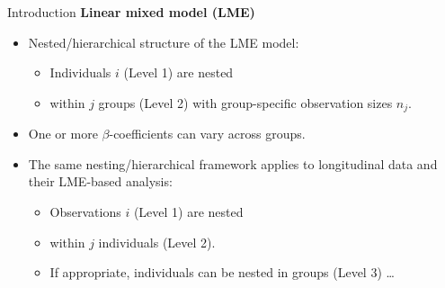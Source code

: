 \documentclass{beamer}
\begin{document}
\begin{frame}{Introduction}
\textbf{Linear mixed model (LME)} 
\medskip
\begin{itemize}
\item Nested/hierarchical structure of the LME model:
\medskip
\begin{itemize}
    \item Individuals $i$ (Level 1) are nested
    \medskip
    \item within $j$ groups (Level 2) with group-specific observation sizes $n_j$.
\end{itemize}
\medskip
\item One or more $\beta$-coefficients can vary across groups.
\bigskip
\item The same nesting/hierarchical framework applies to longitudinal data and their LME-based analysis:
\medskip
\begin{itemize}
    \item Observations $i$ (Level 1) are nested
    \smallskip
    \item within $j$ individuals (Level 2).
    \smallskip
    \item If appropriate, individuals can be nested in groups (Level 3) \dots 
\end{itemize}
\end{itemize}
\end{frame}
\end{document}
